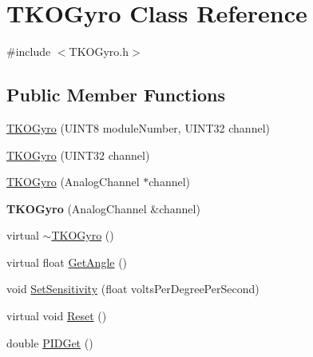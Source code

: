 \hypertarget{class_t_k_o_gyro}{\section{T\-K\-O\-Gyro Class Reference}
\label{class_t_k_o_gyro}
}


{\ttfamily \#include $<$T\-K\-O\-Gyro.\-h$>$}

\subsection*{Public Member Functions}
\begin{DoxyCompactItemize}
\item 
\hyperlink{class_t_k_o_gyro_a38334c169e97dceb6457e989875e93de}{T\-K\-O\-Gyro} (U\-I\-N\-T8 module\-Number, U\-I\-N\-T32 channel)
\item 
\hyperlink{class_t_k_o_gyro_a329cee1199b0935e646591c548e3502a}{T\-K\-O\-Gyro} (U\-I\-N\-T32 channel)
\item 
\hyperlink{class_t_k_o_gyro_ae4b751a9be6ae337957b20e3c3083e37}{T\-K\-O\-Gyro} (Analog\-Channel $\ast$channel)
\item 
\hypertarget{class_t_k_o_gyro_add8212e066db0ef3f2bdd01a9d01bb14}{{\bfseries T\-K\-O\-Gyro} (Analog\-Channel \&channel)}\label{class_t_k_o_gyro_add8212e066db0ef3f2bdd01a9d01bb14}

\item 
virtual \hyperlink{class_t_k_o_gyro_a0a59a50d0805a6f98a507933f77ed037}{$\sim$\-T\-K\-O\-Gyro} ()
\item 
virtual float \hyperlink{class_t_k_o_gyro_af2f5666e5f5d2402ecec2ac87613dc8c}{Get\-Angle} ()
\item 
void \hyperlink{class_t_k_o_gyro_a3b1296faa69e1175d3241f002edbb45e}{Set\-Sensitivity} (float volts\-Per\-Degree\-Per\-Second)
\item 
virtual void \hyperlink{class_t_k_o_gyro_a8d52b80879305a98620be59a5e089b64}{Reset} ()
\item 
double \hyperlink{class_t_k_o_gyro_ae5ab4261974fea729d252dbdad78326a}{P\-I\-D\-Get} ()
\end{DoxyCompactItemize}
